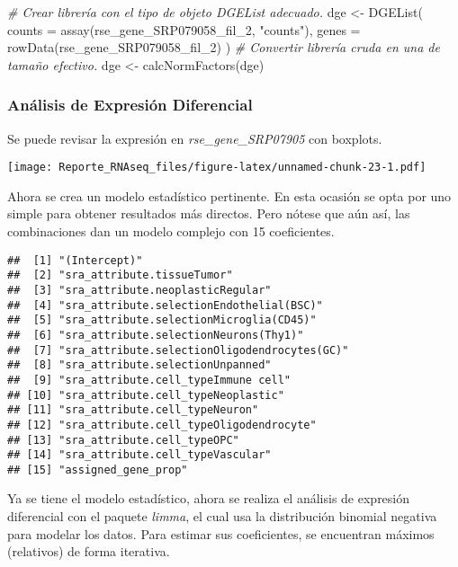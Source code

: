 \documentclass[
]{article}
\newenvironment{Shaded}{\begin{snugshade}}{\end{snugshade}}
\newcommand{\AttributeTok}[1]{\textcolor[rgb]{0.77,0.63,0.00}{#1}}
\newcommand{\CommentTok}[1]{\textcolor[rgb]{0.56,0.35,0.01}{\textit{#1}}}
\newcommand{\FunctionTok}[1]{\textcolor[rgb]{0.00,0.00,0.00}{#1}}
\newcommand{\NormalTok}[1]{#1}
\newcommand{\OtherTok}[1]{\textcolor[rgb]{0.56,0.35,0.01}{#1}}
\newcommand{\StringTok}[1]{\textcolor[rgb]{0.31,0.60,0.02}{#1}}
\begin{document}
\begin{Shaded}
\begin{Highlighting}[]
\CommentTok{\# Crear librería con el tipo de objeto DGEList adecuado.}
\NormalTok{dge }\OtherTok{\textless{}{-}} \FunctionTok{DGEList}\NormalTok{(}
  \AttributeTok{counts =} \FunctionTok{assay}\NormalTok{(rse\_gene\_SRP079058\_fil\_2, }\StringTok{"counts"}\NormalTok{),}
  \AttributeTok{genes =} \FunctionTok{rowData}\NormalTok{(rse\_gene\_SRP079058\_fil\_2)}
\NormalTok{)}
\CommentTok{\# Convertir librería cruda en una de tamaño efectivo.}
\NormalTok{dge }\OtherTok{\textless{}{-}} \FunctionTok{calcNormFactors}\NormalTok{(dge)}
\end{Highlighting}
\end{Shaded}

\hypertarget{anuxe1lisis-de-expresiuxf3n-diferencial}{%
\subsubsection{Análisis de Expresión
Diferencial}\label{anuxe1lisis-de-expresiuxf3n-diferencial}}

Se puede revisar la expresión en \emph{rse\_gene\_SRP07905} con
boxplots.

\texttt{[image: Reporte\_RNAseq\_files/figure-latex/unnamed-chunk-23-1.pdf]}

Ahora se crea un modelo estadístico pertinente. En esta ocasión se opta
por uno simple para obtener resultados más directos. Pero nótese que aún
así, las combinaciones dan un modelo complejo con 15 coeficientes.

\begin{verbatim}
##  [1] "(Intercept)"                                
##  [2] "sra_attribute.tissueTumor"                  
##  [3] "sra_attribute.neoplasticRegular"            
##  [4] "sra_attribute.selectionEndothelial(BSC)"    
##  [5] "sra_attribute.selectionMicroglia(CD45)"     
##  [6] "sra_attribute.selectionNeurons(Thy1)"       
##  [7] "sra_attribute.selectionOligodendrocytes(GC)"
##  [8] "sra_attribute.selectionUnpanned"            
##  [9] "sra_attribute.cell_typeImmune cell"         
## [10] "sra_attribute.cell_typeNeoplastic"          
## [11] "sra_attribute.cell_typeNeuron"              
## [12] "sra_attribute.cell_typeOligodendrocyte"     
## [13] "sra_attribute.cell_typeOPC"                 
## [14] "sra_attribute.cell_typeVascular"            
## [15] "assigned_gene_prop"
\end{verbatim}

Ya se tiene el modelo estadístico, ahora se realiza el análisis de
expresión diferencial con el paquete \emph{limma}, el cual usa la
distribución binomial negativa para modelar los datos. Para estimar sus
coeficientes, se encuentran máximos (relativos) de forma iterativa.
\end{document}
